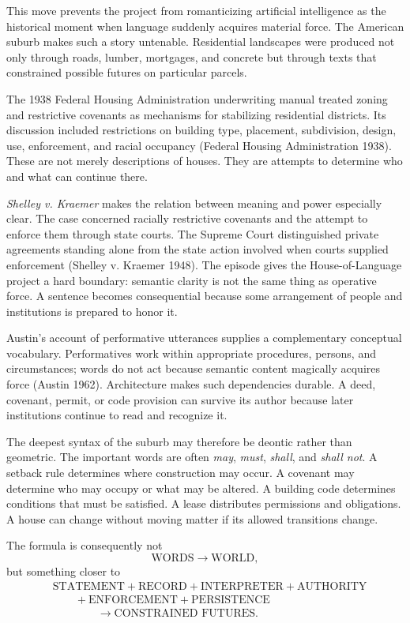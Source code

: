 \documentclass[11pt]{article}
\begin{document}
This move prevents the project from romanticizing artificial intelligence as the historical moment when language suddenly acquires material force. The American suburb makes such a story untenable. Residential landscapes were produced not only through roads, lumber, mortgages, and concrete but through texts that constrained possible futures on particular parcels.

The 1938 Federal Housing Administration underwriting manual treated zoning and restrictive covenants as mechanisms for stabilizing residential districts. Its discussion included restrictions on building type, placement, subdivision, design, use, enforcement, and racial occupancy (Federal Housing Administration 1938). These are not merely descriptions of houses. They are attempts to determine who and what can continue there.

\emph{Shelley v. Kraemer} makes the relation between meaning and power especially clear. The case concerned racially restrictive covenants and the attempt to enforce them through state courts. The Supreme Court distinguished private agreements standing alone from the state action involved when courts supplied enforcement (Shelley v. Kraemer 1948). The episode gives the House-of-Language project a hard boundary: semantic clarity is not the same thing as operative force. A sentence becomes consequential because some arrangement of people and institutions is prepared to honor it.

Austin's account of performative utterances supplies a complementary conceptual vocabulary. Performatives work within appropriate procedures, persons, and circumstances; words do not act because semantic content magically acquires force (Austin 1962). Architecture makes such dependencies durable. A deed, covenant, permit, or code provision can survive its author because later institutions continue to read and recognize it.

The deepest syntax of the suburb may therefore be deontic rather than geometric. The important words are often \emph{may}, \emph{must}, \emph{shall}, and \emph{shall not}. A setback rule determines where construction may occur. A covenant may determine who may occupy or what may be altered. A building code determines conditions that must be satisfied. A lease distributes permissions and obligations. A house can change without moving matter if its allowed transitions change.

The formula is consequently not
\[
\text{WORDS} \rightarrow \text{WORLD},
\]
but something closer to
\[
\begin{aligned}
&\text{STATEMENT} + \text{RECORD} + \text{INTERPRETER} + \text{AUTHORITY} \\
&\qquad + \text{ENFORCEMENT} + \text{PERSISTENCE} \\
&\hspace{4em}\rightarrow \text{CONSTRAINED FUTURES}.
\end{aligned}
\]
\end{document}
